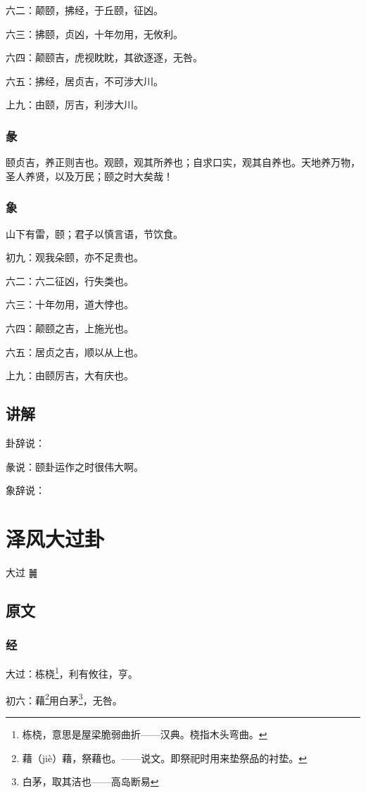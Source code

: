 \documentclass[12pt,oneside]{book}
\begin{document}
六二：颠颐，拂经，于丘颐，征凶。

六三：拂颐，贞凶，十年勿用，无攸利。

六四：颠颐吉，虎视眈眈，其欲逐逐，无咎。

六五：拂经，居贞吉，不可涉大川。

上九：由颐，厉吉，利涉大川。

\subsection{彖}
颐贞吉，养正则吉也。观颐，观其所养也；自求口实，观其自养也。天地养万物，圣人养贤，以及万民；颐之时大矣哉！

\subsection{象}
山下有雷，颐；君子以慎言语，节饮食。

初九：观我朵颐，亦不足贵也。

六二：六二征凶，行失类也。

六三：十年勿用，道大悖也。

六四：颠颐之吉，上施光也。

六五：居贞之吉，顺以从上也。

上九：由颐厉吉，大有庆也。

\section{讲解}
卦辞说：

彖说：颐卦运作之时很伟大啊。

象辞说：


\chapter{泽风大过卦}
大过 {\Large ䷛}

\section{原文}

\subsection{经}
大过：栋桡\footnote{栋桡，意思是屋梁脆弱曲折——汉典。桡指木头弯曲。}，利有攸往，亨。

初六：藉\footnote{藉（jiè）藉，祭藉也。——说文。即祭祀时用来垫祭品的衬垫。}用白茅\footnote{白茅，取其洁也——高岛断易}，无咎。
\end{document}

